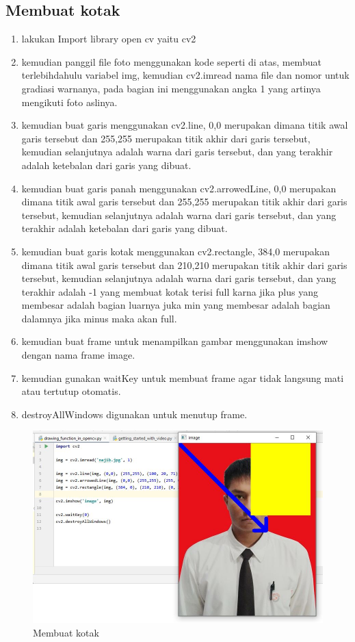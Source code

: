 \subsection{Membuat kotak}

\begin{enumerate}
	\item lakukan Import library open cv yaitu cv2
	\item kemudian panggil file foto menggunakan kode seperti di atas, membuat terlebihdahulu variabel img, kemudian cv2.imread nama file dan nomor untuk gradiasi warnanya, pada bagian ini menggunakan angka 1 yang artinya mengikuti foto aslinya.
	\item kemudian buat garis menggunakan cv2.line, 0,0 merupakan dimana titik awal garis tersebut dan 255,255 merupakan titik akhir dari garis tersebut, kemudian selanjutnya adalah warna dari garis tersebut, dan yang terakhir adalah ketebalan dari garis yang dibuat.
	\item kemudian buat garis panah menggunakan cv2.arrowedLine, 0,0 merupakan dimana titik awal garis tersebut dan 255,255 merupakan titik akhir dari garis tersebut, kemudian selanjutnya adalah warna dari garis tersebut, dan yang terakhir adalah ketebalan dari garis yang dibuat.
	\item kemudian buat garis kotak menggunakan cv2.rectangle, 384,0 merupakan dimana titik awal garis tersebut dan 210,210 merupakan titik akhir dari garis tersebut, kemudian selanjutnya adalah warna dari garis tersebut, dan yang terakhir adalah -1 yang membuat kotak terisi full karna jika plus yang membesar adalah bagian luarnya juka min yang membesar adalah bagian dalamnya jika minus maka akan full.
	\item kemudian buat frame untuk menampilkan gambar menggunakan imshow dengan nama frame image.
	\item kemudian gunakan waitKey untuk membuat frame agar tidak langsung mati atau tertutup otomatis.
	\item destroyAllWindows digunakan untuk menutup frame.
\end{enumerate}

\newpage
\begin{figure}[ht]
\centering
\includegraphics[scale=0.5]{figures/2,12.jpg}
\caption{Membuat kotak}
\label{contoh}
\end{figure}

